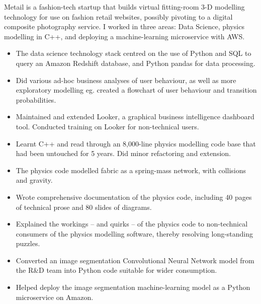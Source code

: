 \documentclass[11pt,a4paper,sans]{moderncv} %
\begin{document}
{Metail is a fashion-tech startup that builds virtual fitting-room 3-D modelling technology for use on fashion retail websites, possibly pivoting to a digital composite photography service.  I worked in three areas: Data Science, physics modelling in C++, and deploying a machine-learning microservice with AWS.
	\begin{itemize}
		\item The data science technology stack centred on the use of Python and SQL to query an Amazon Redshift database, and Python pandas for data processing.
		\item Did various ad-hoc business analyses of user behaviour, as well as more exploratory modelling eg. created a flowchart of user behaviour and transition probabilities.
		\item Maintained and extended Looker, a graphical business intelligence dashboard tool.  Conducted training on Looker for non-technical users.
		\item Learnt C++ and read through an 8,000-line physics modelling code base that had been untouched for 5 years.  Did minor refactoring and extension.
		\item The physics code modelled fabric as a spring-mass network, with collisions and gravity.
		\item Wrote comprehensive documentation of the physics code, including 40 pages of technical prose and 80 slides of diagrams.
		\item Explained the workings -- and quirks -- of the physics code to non-technical consumers of the physics modelling software, thereby resolving long-standing puzzles.
		\item Converted an image segmentation Convolutional Neural Network model from the R\&D team into Python code suitable for wider consumption.
		\item Helped deploy the image segmentation machine-learning model as a Python microservice on Amazon.
	\end{itemize}
}

\pagebreak
\end{document}
